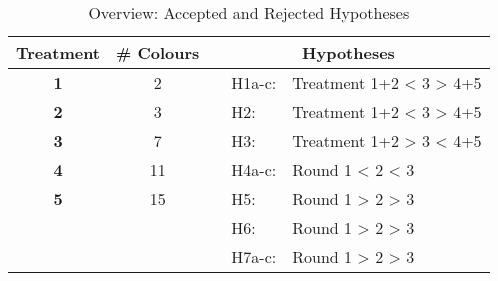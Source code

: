 \begin{table}[htbp] %
  \centering
  \caption{Overview: Accepted and Rejected Hypotheses}
  \label{tab:HypothesesEvalutation}
    \begin{tabular}{cc|rrr}
    \toprule
    \textbf{Treatment} & \textbf{\# Colours} & \multicolumn{3}{c}{\textbf{Hypotheses}} \\
    \midrule
    \textbf{1} & 2     &  & \multicolumn{1}{l}{H1a-c: } & \multicolumn{1}{l}{Treatment 1+2 < 3 > 4+5} \\
    \textbf{2} & 3     &       & \multicolumn{1}{l}{H2: } & \multicolumn{1}{l}{Treatment 1+2 < 3 > 4+5} \\
    \textbf{3} & 7    &    &  \multicolumn{1}{l}{H3: } & \multicolumn{1}{l}{Treatment 1+2 > 3 < 4+5} \\
    \textbf{4} & 11    &    &  \multicolumn{1}{l}{H4a-c: } & \multicolumn{1}{l}{Round 1 < 2 < 3} \\
    \textbf{5} &  15	   &    &  \multicolumn{1}{l}{H5: } & \multicolumn{1}{l}{Round 1 > 2 > 3} \\
     & 		&    &  \multicolumn{1}{l}{H6: } & \multicolumn{1}{l}{Round 1 > 2 > 3} \\
     & 		&    &  \multicolumn{1}{l}{H7a-c: } & \multicolumn{1}{l}{Round 1 > 2 > 3} \\
    \bottomrule
    \end{tabular}%
\end{table}%

